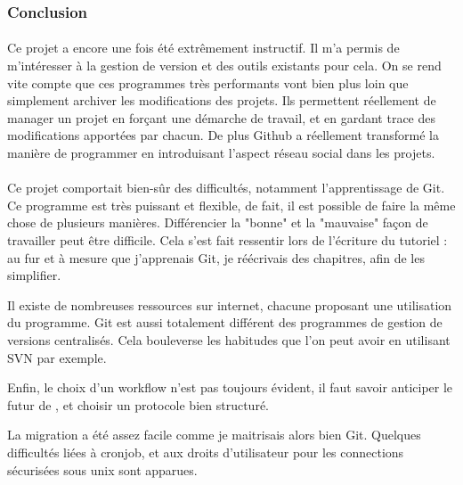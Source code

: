\clearpage

\subsubsection*{Conclusion}

\paragraph*{}
Ce projet a encore une fois été extrêmement instructif.
Il m'a permis de m'intéresser à la gestion de version et des outils existants pour cela.
On se rend vite compte que ces programmes très performants vont bien plus loin que simplement archiver les modifications des projets.
Ils permettent réellement de manager un projet en forçant une démarche de travail, et en gardant trace des modifications apportées par chacun.
De plus Github a réellement transformé la manière de programmer en introduisant l'aspect réseau social dans les projets.

\paragraph*{}
Ce projet comportait bien-sûr des difficultés, notamment l'apprentissage de Git. Ce programme est très puissant et flexible, de fait, il est possible de faire la même chose de plusieurs manières. Différencier la "bonne" et la "mauvaise" façon de travailler peut être difficile. Cela s'est fait ressentir lors de l'écriture du tutoriel : au fur et à mesure que j'apprenais Git, je réécrivais des chapitres, afin de les simplifier.

Il existe de nombreuses ressources sur internet, chacune proposant une utilisation du programme.
Git est aussi totalement différent des programmes de gestion de versions centralisés. Cela bouleverse les habitudes que l'on peut avoir en utilisant SVN par exemple.

Enfin, le choix d'un workflow n'est pas toujours évident, il faut savoir anticiper le futur de {\gofigure}, et choisir un protocole bien structuré. 

La migration a été assez facile comme je maitrisais alors bien Git. Quelques difficultés liées à cronjob, et aux droits d'utilisateur pour les connections sécurisées sous unix sont apparues.





